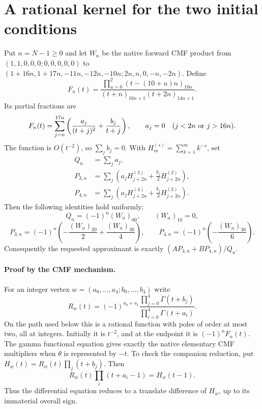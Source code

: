 \documentclass[11pt]{article}
\begin{document}
\section{A rational kernel for the two initial conditions}
Put $n=N-1\ge0$ and let $W_n$ be the native forward CMF product from
$(1,1,0,0,0;0,0,0,0,0)$ to
$(1+16n,1+17n,-11n,-12n,-10n;2n,n,0,-n,-2n)$.
Define
\[
 F_n(t)=\frac{\prod_{u=0}^2(t-(10+u)n)_{10n}}
 {(t+n)_{16n+1}(t+2n)_{14n+1}}.
\]
Its partial fractions are
\[
 F_n(t)=\sum_{j=n}^{17n}\left(\frac{a_j}{(t+j)^2}
                    +\frac{b_j}{t+j}\right),\qquad
 a_j=0\quad(j<2n\ \hbox{or}\ j>16n).
\]
The function is $O(t^{-2})$, so $\sum_jb_j=0$.
With $H_m^{(s)}=\sum_{k=1}^m k^{-s}$, set
\begin{align*}
 Q_n&=\sum_j a_j,\\
 P_{3,n}&=\sum_j\left(a_jH_{j+2n}^{(3)}+
                              \frac{b_j}{2}H_{j+2n}^{(2)}\right),\\
 P_{4,n}&=\sum_j\left(a_jH_{j+2n}^{(4)}+
                              \frac{b_j}{3}H_{j+2n}^{(3)}\right).
\end{align*}
Then the following identities hold uniformly:
\[
 Q_n=(-1)^n(W_n)_{00},\qquad (W_n)_{10}=0,
\]
\[
 P_{3,n}=(-1)^n\left(-\frac{(W_n)_{20}}2+
                              \frac{(W_n)_{30}}4\right),\qquad
 P_{4,n}=(-1)^n\left(-\frac{(W_n)_{30}}6\right).
\]
Consequently the requested approximant is exactly
$(A P_{3,n}+B P_{4,n})/Q_n$.

\paragraph{Proof by the CMF mechanism.}
For an integer vertex $w=(a_0,\ldots,a_4;b_0,\ldots,b_4)$ write
\[
 R_w(t)=(-1)^{a_0+a_1}
       \frac{\prod_{j=0}^4\Gamma(t+b_j)}
            {\prod_{i=0}^4\Gamma(t+a_i)}.
\]
On the path used below this is a rational function with poles of order at
most two, all at integers.  Initially it is $t^{-2}$, and at the endpoint
it is $(-1)^nF_n(t)$.  The gamma functional equation gives exactly the
native elementary CMF multipliers when $\theta$ is represented by $-t$.
To check the companion reduction, put
$H_w(t)=R_w(t)\prod_j(t+b_j)$.  Then
\[
 R_w(t)\prod_i(t+a_i-1)=H_w(t-1).
\]
Thus the differential equation reduces to a translate difference of
$H_w$, up to its immaterial overall sign.
\end{document}
